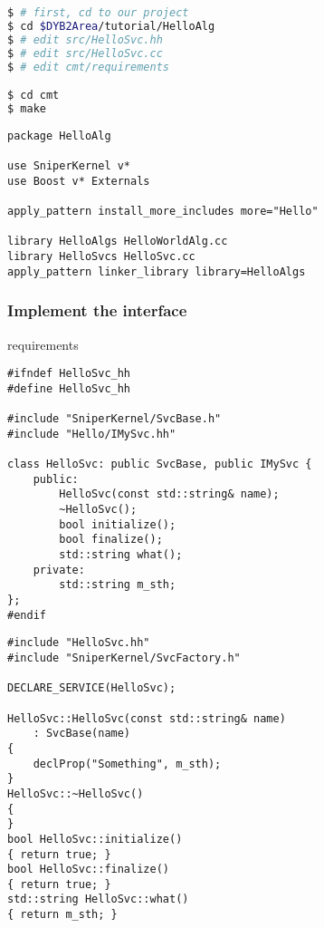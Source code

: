 \newsavebox{\implinterfacesh}
\begin{lrbox}{\implinterfacesh}
\begin{lstlisting}[language=bash]
$ # first, cd to our project
$ cd $DYB2Area/tutorial/HelloAlg
$ # edit src/HelloSvc.hh
$ # edit src/HelloSvc.cc
$ # edit cmt/requirements

$ cd cmt
$ make
\end{lstlisting}
\end{lrbox}
\newsavebox{\implinterfacereq}
\begin{lrbox}{\implinterfacereq}
\begin{lstlisting}[linebackgroundcolor={\ifnum\value{lstnumber}=6\color{green}\fi}]
package HelloAlg

use SniperKernel v*
use Boost v* Externals

apply_pattern install_more_includes more="Hello" 

library HelloAlgs HelloWorldAlg.cc
library HelloSvcs HelloSvc.cc
apply_pattern linker_library library=HelloAlgs
\end{lstlisting}
\end{lrbox}

\begin{frame}
    \frametitle{Implement the interface}
    \par\usebox{\implinterfacesh}
    \begin{block}{requirements}
    \par\usebox{\implinterfacereq}
    \end{block}
\end{frame}

\newsavebox{\implinterfaceheader}
\begin{lrbox}{\implinterfaceheader}
\begin{lstlisting}
#ifndef HelloSvc_hh
#define HelloSvc_hh

#include "SniperKernel/SvcBase.h"
#include "Hello/IMySvc.hh"

class HelloSvc: public SvcBase, public IMySvc {
    public:
        HelloSvc(const std::string& name);
        ~HelloSvc();
        bool initialize();
        bool finalize();
        std::string what();
    private:
        std::string m_sth;
};
#endif
\end{lstlisting}
\end{lrbox}
\newsavebox{\implinterfaceimpl}
\begin{lrbox}{\implinterfaceimpl}
\begin{lstlisting}[linebackgroundcolor={\ifnum\value{lstnumber}=4\color{green}\fi}]
#include "HelloSvc.hh"
#include "SniperKernel/SvcFactory.h"

DECLARE_SERVICE(HelloSvc);

HelloSvc::HelloSvc(const std::string& name)
    : SvcBase(name)
{
    declProp("Something", m_sth);
}
HelloSvc::~HelloSvc()
{
}
bool HelloSvc::initialize()
{ return true; }
bool HelloSvc::finalize()
{ return true; }
std::string HelloSvc::what()
{ return m_sth; }
\end{lstlisting}
\end{lrbox}

